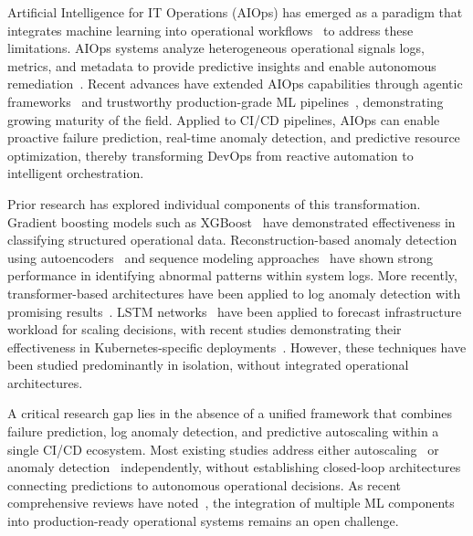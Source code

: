 \documentclass[a4paper,fleqn]{cas-dc}
\begin{document}
Artificial Intelligence for IT Operations (AIOps) has emerged as a paradigm that integrates machine learning into operational workflows~\citep{dang2019aiops} to address these limitations.
AIOps systems analyze heterogeneous operational signals logs, metrics, and metadata to provide predictive insights and enable autonomous remediation~\citep{notaro2021aiops}.
Recent advances have extended AIOps capabilities through agentic frameworks~\citep{zota2025agentic} and trustworthy production-grade ML pipelines~\citep{bayram2025trustworthy}, demonstrating growing maturity of the field.
Applied to CI/CD pipelines, AIOps can enable proactive failure prediction, real-time anomaly detection, and predictive resource optimization, thereby transforming DevOps from reactive automation to intelligent orchestration.

Prior research has explored individual components of this transformation. Gradient boosting models such as XGBoost~\citep{chen2016xgboost} have demonstrated effectiveness in classifying structured operational data.
Reconstruction-based anomaly detection using autoencoders~\citep{sakurada2014anomaly} and sequence modeling approaches~\citep{du2017deeplog, meng2019loganomaly} have shown strong performance in identifying abnormal patterns within system logs.
More recently, transformer-based architectures have been applied to log anomaly detection with promising results~\citep{liao2025logtransformer, zhou2024logllm}.
LSTM networks~\citep{hochreiter1997lstm} have been applied to forecast infrastructure workload for scaling decisions, with recent studies demonstrating their effectiveness in Kubernetes-specific deployments~\citep{guruge2025prophet, dasilva2025adaptive}.
However, these techniques have been studied predominantly in isolation, without integrated operational architectures.

A critical research gap lies in the absence of a unified framework that combines failure prediction, log anomaly detection, and predictive autoscaling within a single CI/CD ecosystem.
Most existing studies address either autoscaling~\citep{lorido2014autoscaling, machiraju2026mlautoscaling} or anomaly detection~\citep{le2022log, kanahols2025timeseries} independently, without establishing closed-loop architectures connecting predictions to autonomous operational decisions.
As recent comprehensive reviews have noted~\citep{zota2025agentic, bayram2025trustworthy}, the integration of multiple ML components into production-ready operational systems remains an open challenge.
\end{document}
